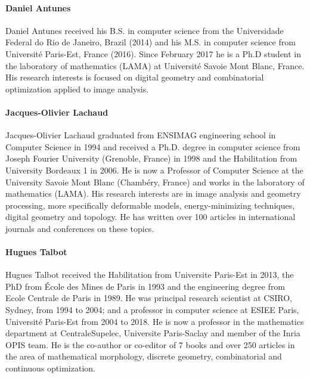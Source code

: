 

\paragraph{Daniel Antunes}
Daniel Antunes received his B.S. in computer science from the Universidade Federal do Rio de Janeiro, Brazil (2014) and his M.S. in  computer science from Universit\'e Paris-Est, France (2016). Since February 2017 he is a Ph.D student in the laboratory of mathematics (LAMA) at Universit\'e Savoie Mont Blanc, France. His research interests is focused on digital geometry and combinatorial optimization applied to image analysis.


\paragraph{Jacques-Olivier Lachaud}
Jacques-Olivier Lachaud graduated from ENSIMAG engineering school in
Computer Science in 1994 and received a Ph.D. degree in computer
science from Joseph Fourier University (Grenoble, France) in 1998 and
the Habilitation from University Bordeaux 1 in 2006. He is now a
Professor of Computer Science at the University Savoie Mont Blanc
(Chambéry, France) and works in the laboratory of mathematics
(LAMA). His research interests are in image analysis and geometry
processing, more specifically deformable models, energy-minimizing
techniques, digital geometry and topology. He has written over 100
articles in international journals and conferences on these topics.

\paragraph{Hugues Talbot}
Hugues Talbot received the Habilitation from Universite Paris-Est in
2013, the PhD from \'Ecole des Mines de Paris in 1993 and the
engineering degree from Ecole Centrale de Paris in 1989. He was
principal research scientist at CSIRO, Sydney, from 1994 to 2004; and
a professor in computer science at ESIEE Paris, Universit\'e Paris-Est
from 2004 to 2018. He is now a professor in the mathematics department
at CentraleSupelec, Universite Paris-Saclay and member of the Inria
OPIS team. He is the co-author or co-editor of 7 books and over 250
articles in the area of mathematical morphology, discrete geometry,
combinatorial and continuous optimization.

